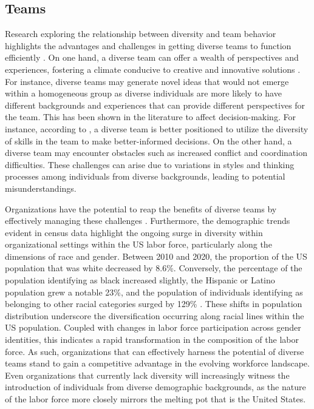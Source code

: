 \subsection{Teams}
Research exploring the relationship between diversity and team behavior highlights the advantages and challenges in getting diverse teams to function efficiently  \citep{po15}. On one hand, a diverse team can offer a wealth of perspectives and experiences, fostering a climate conducive to creative and innovative solutions \citep{rvhv13}. For instance, diverse teams may generate novel ideas that would not emerge within a homogeneous group as diverse individuals are more likely to have different backgrounds and experiences that can provide different perspectives for the team. This has been shown in the literature to affect decision-making. For instance, according to \cite{ks16}, a diverse team is better positioned to utilize the diversity of skills in the team to make better-informed decisions. On the other hand, a diverse team may encounter obstacles such as increased conflict and coordination difficulties. These challenges can arise due to variations in styles and thinking processes among individuals from diverse backgrounds, leading to potential misunderstandings.  

\hspace *{0mm} Organizations have the potential to reap the benefits of diverse teams by effectively managing these challenges \citep{j23}. Furthermore, the demographic trends evident in census data highlight the ongoing surge in diversity within organizational settings within the US labor force, particularly along the dimensions of race and gender. Between 2010 and 2020, the proportion of the US population that was white decreased by 8.6\%.  Conversely, the percentage of the population identifying as black increased slightly, the Hispanic or Latino population grew a notable 23\%, and the population of individuals identifying as belonging to other racial categories surged by 129\% \citep{b20}. These shifts in population distribution underscore the diversification occurring along racial lines within the US population. Coupled with changes in labor force participation across gender identities, this indicates a rapid transformation in the composition of the labor force. As such, organizations that can effectively harness the potential of diverse teams stand to gain a competitive advantage in the evolving workforce landscape. Even organizations that currently lack diversity will increasingly witness the introduction of individuals from diverse demographic backgrounds, as the nature of the labor force more closely mirrors the melting pot that is the United States. 

